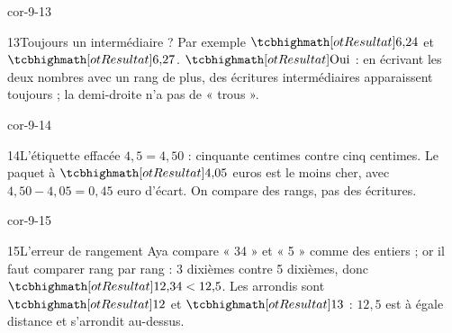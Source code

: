 \begin{blocLivre}{cor-9-13}\begin{corrige}{13}{Toujours un intermédiaire ?}
Par exemple $\res{6{,}24}$ et $\res{6{,}27}$. $\res{\text{Oui}}$ : en écrivant les deux nombres avec un rang de plus, des écritures intermédiaires apparaissent toujours ; la demi-droite n’a pas de « trous ».
\end{corrige}\end{blocLivre}
\begin{blocLivre}{cor-9-14}\begin{corrige}{14}{L’étiquette effacée}
$4{,}5=4{,}50$ : cinquante centimes contre cinq centimes. Le paquet à $\res{4{,}05}$ euros est le moins cher, avec $4{,}50-4{,}05=0{,}45$ euro d’écart. On compare des rangs, pas des écritures.
\end{corrige}\end{blocLivre}
\begin{blocLivre}{cor-9-15}\begin{corrige}{15}{L’erreur de rangement}
Aya compare « 34 » et « 5 » comme des entiers ; or il faut comparer rang par rang : 3 dixièmes contre 5 dixièmes, donc $\res{12{,}34<12{,}5}$. Les arrondis sont $\res{12}$ et $\res{13}$ : $12{,}5$ est à égale distance et s’arrondit au-dessus.
\end{corrige}\end{blocLivre}
